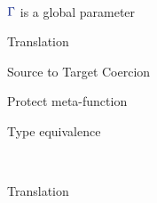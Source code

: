 \medskip

\begin{figure}%
  \label{fig:trans}
  \fbox{$\sexp \trans \texp$} \\
  $\senv$ is a global parameter 
  \begin{framed}
    
  \end{framed}
  \caption{Translation}
\end{figure}

\medskip

\begin{figure}%
    \centering
      \centering
      \begin{framed}
        
      \end{framed}
      \caption{Target to Source Coercion}
      \medskip\medskip\medskip\medskip\medskip
      \centering
      \begin{framed}
        
      \end{framed}
      \caption{Source to Target Coercion}
\end{figure}

\medskip

\begin{figure}%
  \label{fig:protect}
  \begin{framed}
    
  \end{framed}
  \caption{Protect meta-function}
\end{figure}

\medskip

\begin{figure}%
  \label{fig:typeq}
  \begin{framed}
    
  \end{framed}
  \caption{Type equivalence}
\end{figure}


\medskip

\begin{figure}%
  \label{fig:trans}
  \fbox{$\sexp \trans \texp$} \\
  \begin{framed}
    
  \end{framed}
  \caption{Translation}
  \label{fig:translationlong}
\end{figure}

